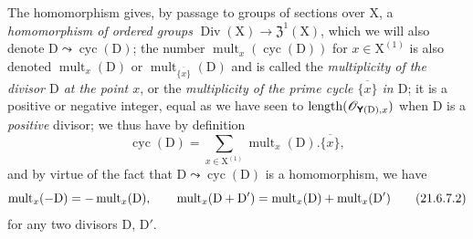 \begin{env}[21.6.7]
\label{IV.21.6.7}
The homomorphism  gives, by passage to groups of sections over $\mathrm{X}$, a \emph{homomorphism of ordered groups} $\operatorname{Div}(\mathrm{X})\to\mathfrak{Z}^1(\mathrm{X})$, which we will also denote $\mathrm{D}\leadsto\operatorname{cyc}(\mathrm{D})$;
the number $\operatorname{mult}_x(\operatorname{cyc}(\mathrm{D}))$ for $x\in\mathrm{X}^{(1)}$ is also denoted $\operatorname{mult}_x(\mathrm{D})$ or $\operatorname{mult}_{\overline{\{x\}}}(\mathrm{D})$ and is called the \emph{multiplicity of the divisor $\mathrm{D}$ at the point $x$}, or the \emph{multiplicity of the prime cycle $\overline{\{x\}}$ in $\mathrm{D}$};
it is a positive or negative integer, equal as we have seen to $\operatorname{length}(\mathscr{O}_{\boldsymbol{\mathsf{Y}}(\mathrm{D}),x})$ when $\mathrm{D}$ is a \emph{positive} divisor;
we thus have by definition
\[
\label{IV.21.6.7.1}
  \operatorname{cyc}(\mathrm{D})=\sum_{x\in\mathrm{X}^{(1)}}\operatorname{mult}_x(\mathrm{D}).\overline{\{x\}},
  \tag{21.6.7.1}
\]
and by virtue of the fact that $\mathrm{D}\leadsto\operatorname{cyc}(\mathrm{D})$ is a homomorphism, we have
\[
\label{IV.21.6.7.2}
  \operatorname{mult}_x(- \mathrm{D})=-\operatorname{mult}_x(\mathrm{D}),\qquad\operatorname{mult}_x(\mathrm{D}+\mathrm{D}')=\operatorname{mult}_x(\mathrm{D})+\operatorname{mult}_x(\mathrm{D}')
  \tag{21.6.7.2}
\]
for any two divisors $\mathrm{D}$, $\mathrm{D}'$.


\end{env}
